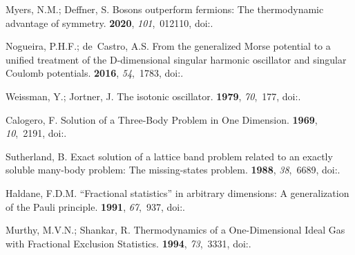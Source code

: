\documentclass[preprints,article,accept,moreauthors,pdftex]{Definitions/mdpi}
\begin{document}
\begin{thebibliography}{999}
Myers, N.M.; Deffner, S.
\newblock Bosons outperform fermions: The thermodynamic advantage of symmetry.
 {\bf 2020}, {\em 101},~012110,
\newblock
  doi:{\href{https://doi.org/10.1103/PhysRevE.101.012110}{}}.

Nogueira, P.H.F.; de~Castro, A.S.
\newblock From the generalized {M}orse potential to a unified treatment of the
  {D}-dimensional singular harmonic oscillator and singular {C}oulomb
  potentials.
 {\bf 2016}, {\em 54},~1783,
\newblock
  doi:{\href{https://doi.org/10.1007/s10910-016-0635-6}{}}.

Weissman, Y.; Jortner, J.
\newblock The isotonic oscillator.
 {\bf 1979}, {\em 70},~177,
\newblock
  doi:{\href{https://doi.org/10.1016/0375-9601(79)90197-X}{}}.

Calogero, F.
\newblock Solution of a Three‐Body Problem in One Dimension.
 {\bf 1969}, {\em 10},~2191,
\newblock
  doi:{\href{https://doi.org/10.1063/1.1664820}{}}.

Sutherland, B.
\newblock Exact solution of a lattice band problem related to an exactly
  soluble many-body problem: The missing-states problem.
 {\bf 1988}, {\em 38},~6689,
\newblock
  doi:{\href{https://doi.org/10.1103/PhysRevB.38.6689}{}}.

Haldane, F.D.M.
\newblock ``Fractional statistics'' in arbitrary dimensions: A generalization
  of the {P}auli principle.
 {\bf 1991}, {\em 67},~937,
\newblock
  doi:{\href{https://doi.org/10.1103/PhysRevLett.67.937}{}}.

Murthy, M.V.N.; Shankar, R.
\newblock Thermodynamics of a One-Dimensional Ideal Gas with Fractional
  Exclusion Statistics.
 {\bf 1994}, {\em 73},~3331,
\newblock
  doi:{\href{https://doi.org/10.1103/PhysRevLett.73.3331}{}}.


\end{thebibliography}
\end{document}
